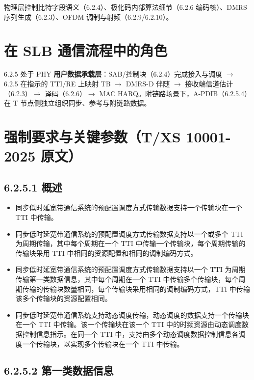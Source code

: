 \documentclass[11pt,a4paper]{ctexart}
\begin{document}
物理层控制比特字段语义（6.2.4）、极化码内部算法细节（6.2.6 编码核）、DMRS 序列生成（6.2.3）、OFDM 调制与射频（6.2.9/6.2.10）。

\section{在 SLB 通信流程中的角色}

6.2.5 处于 PHY \textbf{用户数据承载层}：SAB/控制块（6.2.4）完成接入与调度 $\rightarrow$ 6.2.5 在指示的 TTI/RE 上映射 TB $\rightarrow$ DMRS-D 伴随 $\rightarrow$ 接收端信道估计（6.2.3）$\rightarrow$ 译码（6.2.6）$\rightarrow$ MAC HARQ。附链路场景下，A-PDIB（6.2.5.4）在 T 节点侧独立组织同步、参考与附链路数据。

\section{强制要求与关键参数（T/XS 10001-2025 原文）}

\subsection{6.2.5.1 概述}

\begin{itemize}[nosep]
  \item 同步低时延宽带通信系统的预配置调度方式传输数据支持一个传输块在一个 TTI 中传输。
  \item 同步低时延宽带通信系统的预配置调度方式传输数据支持以一个或多个 TTI 为周期传输，其中每个周期在一个 TTI 中传输一个传输块，每个周期传输的传输块采用 TTI 中相同的资源配置和相同的调制编码方式。
  \item 同步低时延宽带通信系统的预配置调度方式传输数据支持以一个 TTI 为周期传输第一类数据信息，其中每个周期在一个 TTI 中传输多个传输块，每个周期传输的传输块数量相同，每个传输块采用相同的调制编码方式，TTI 中传输该多个传输块的资源配置相同。
  \item 同步低时延宽带通信系统支持动态调度传输，动态调度的数据支持一个传输块在一个 TTI 中传输。该一个传输块在该一个 TTI 中的时频资源由动态调度数据控制信息指示。在同一个 TTI 中，支持由多个动态调度数据控制信息各调度一个传输块，以实现多个传输块在一个 TTI 中传输。
\end{itemize}

\subsection{6.2.5.2 第一类数据信息}
\end{document}

